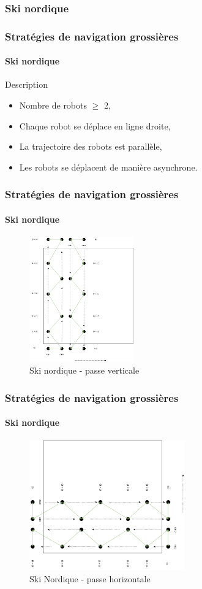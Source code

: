 \documentclass{beamer}
\begin{document}
			\subsubsection{Ski nordique}
				\begin{frame}
					\frametitle{Stratégies de navigation grossières}
					\framesubtitle{Ski nordique}
					\begin{block}{Description}
						\begin{itemize}
							\item Nombre de robots $\ge$ 2,
							\item Chaque robot se déplace en ligne droite,
							\item La trajectoire des robots est parallèle,
							\item Les robots se déplacent de manière asynchrone.
						\end{itemize}
					\end{block}
				\end{frame}
				\begin{frame}
					\frametitle{Stratégies de navigation grossières}
					\framesubtitle{Ski nordique}
					\begin{figure}
						\centering
						\includegraphics[width=0.4\textwidth]{graphics/ski_nordique1.png}
						\caption{Ski nordique - passe verticale}
					\end{figure}
				\end{frame}
				\begin{frame}
					\frametitle{Stratégies de navigation grossières}
					\framesubtitle{Ski nordique}
					\begin{figure}
						\centering
						\includegraphics[width=0.6\textwidth]{graphics/ski_nordique2.png}
						\caption{Ski Nordique - passe horizontale}
					\end{figure}
				\end{frame}
\end{document}
